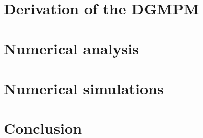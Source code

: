 \documentclass[11pt,aspectratio=169]{beamer}
\begin{document}
\section{Derivation of the DGMPM}



\section{Numerical analysis}




\section{Numerical simulations}


\section*{Conclusion}
\end{document}
